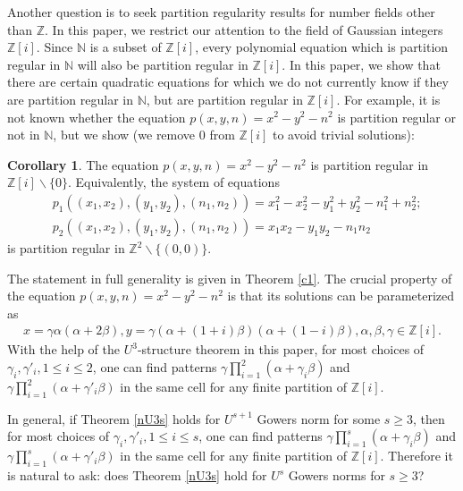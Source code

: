 \documentclass[12pt,amstex]{amsart}
\theoremstyle{definition}
\newtheorem{cor}[thm]{Corollary}
\def \Z {\mathbb{Z}[i]}
\def \A {\alpha}
\def \B {\beta}
\def \C {\gamma}
\begin{document}
Another question is to seek partition regularity results for number fields other than $\mathbb{Z}$. In this paper, we restrict our attention to the field of Gaussian integers $\mathbb{Z}[i]$. Since $\mathbb{N}$ is a subset of $\mathbb{Z}[i]$, every polynomial equation which is partition regular in $\mathbb{N}$ will also be partition regular in $\mathbb{Z}[i]$. In this paper, we show that there are certain quadratic equations for which we do not currently know if they are partition regular in $\mathbb{N}$, but are partition regular in $\mathbb{Z}[i]$. For example, it is not known whether the equation $p(x,y,n)=x^{2}-y^{2}-n^{2}$ is partition regular or not in $\mathbb{N}$, but we show (we remove 0 from $\Z$ to avoid trivial solutions):
\begin{cor}\label{c11}
  The equation $p(x,y,n)=x^{2}-y^{2}-n^{2}$ is partition regular in $\Z\backslash \{0\}$. Equivalently, the system of equations
  \begin{equation} \nonumber
  \begin{split}
          & p_{1}((x_{1},x_{2}),(y_{1},y_{2}),(n_{1},n_{2}))=x_{1}^{2}-x_{2}^{2}-y_{1}^{2}+y_{2}^{2}-n_{1}^{2}+n_{2}^{2};
          \\& p_{2}((x_{1},x_{2}),(y_{1},y_{2}),(n_{1},n_{2}))=x_{1}x_{2}-y_{1}y_{2}-n_{1}n_{2}
   \end{split}
   \end{equation}
is partition regular in $\mathbb{Z}^{2}\backslash \{(0,0)\}$.
\end{cor}
The statement in full generality is given in Theorem \ref{c1}. The crucial property of the equation $p(x,y,n)=x^{2}-y^{2}-n^{2}$ is that its solutions can be parameterized as
  \begin{equation} \nonumber
  \begin{split}
          x=\C\A(\A+2\B), y=\C(\A+(1+i)\B)(\A+(1-i)\B),\A,\B,\C\in\Z.
   \end{split}
   \end{equation}
With the help of the $U^{3}$-structure theorem in this paper, for most choices of $\C_{i},\C'_{i},1\leq i\leq 2$, one can find patterns $\C\prod_{i=1}^{2}(\A+\C_{i}\B)$ and $\C\prod_{i=1}^{2}(\A+\C'_{i}\B)$ in the same cell for any finite partition of $\Z$.

In general, if Theorem \ref{nU3s} holds for $U^{s+1}$ Gowers norm for some $s\geq 3$, then for most choices of $\C_{i},\C'_{i},1\leq i\leq s$, one can find patterns $\C\prod_{i=1}^{s}(\A+\C_{i}\B)$ and $\C\prod_{i=1}^{s}(\A+\C'_{i}\B)$ in the same cell for any finite partition of $\Z$. Therefore it is natural to ask: does Theorem \ref{nU3s} hold for $U^{s}$ Gowers norms for $s\geq 3$?
\end{document}
